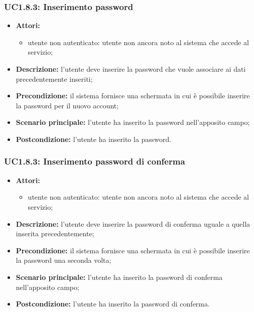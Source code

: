 \subsubsection{UC1.8.3: Inserimento password}
\begin{itemize}
	\item \textbf{Attori:}
	\begin{itemize}
		\item utente non autenticato: utente non ancora noto al sistema che accede al servizio;
	\end{itemize}
	\item \textbf{Descrizione:} l'utente deve inserire la password che vuole associare ai dati precedentemente inseriti;
	\item \textbf{Precondizione:} il sistema fornisce una schermata in cui è possibile inserire la password per il nuovo account;
	\item \textbf{Scenario principale:} l'utente ha inserito la password nell'apposito campo;
	\item \textbf{Postcondizione:} l'utente ha inserito la password.
\end{itemize}

\subsubsection{UC1.8.3: Inserimento password di conferma}
\begin{itemize}
	\item \textbf{Attori:}
	\begin{itemize}
		\item utente non autenticato: utente non ancora noto al sistema che accede al servizio;
	\end{itemize}
	\item \textbf{Descrizione:} l'utente deve inserire la password di conferma uguale a quella inserita precedentemente;
	\item \textbf{Precondizione:} il sistema fornisce una schermata in cui è possibile inserire la password una seconda volta;
	\item \textbf{Scenario principale:} l'utente ha inserito la password di conferma nell'apposito campo;
	\item \textbf{Postcondizione:} l'utente ha inserito la password di conferma.
\end{itemize}

